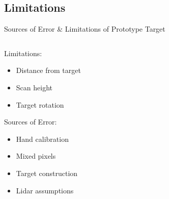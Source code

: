 \documentclass{beamer}
\begin{document}
\subsection{Limitations}
\begin{frame}{Sources of Error \& Limitations of Prototype Target}
    \begin{columns}[T]
        \begin{column}{.5\textwidth}
        Limitations:
        \begin{itemize}
            \item{Distance from target}
            \item{Scan height}
            \item{Target rotation}
        \end{itemize}
        Sources of Error:
        \begin{itemize}
            \item{Hand calibration}
            \item{Mixed pixels}
            \item{Target construction}
            \item{Lidar assumptions}
        \end{itemize}
        \end{column}
        \begin{column}{.5\textwidth}
            \begin{figure}
                \centering
                
            \end{figure}
        \end{column}
    \end{columns} 
\end{frame}

\end{document}
